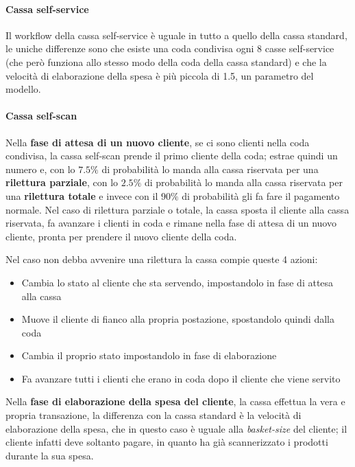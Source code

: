 \paragraph{Cassa self-service}

Il workflow della cassa self-service è uguale in tutto a quello della cassa standard, le uniche differenze sono che esiste una coda condivisa ogni 8 casse self-service (che però funziona allo stesso modo della coda della cassa standard) e che la velocità di elaborazione della spesa è più piccola di 1.5, un parametro del modello.

\paragraph{Cassa self-scan}

Nella \textbf{fase di attesa di un nuovo cliente}, se ci sono clienti nella coda condivisa, la cassa self-scan prende il primo cliente della coda; estrae quindi un numero e, con lo $7.5 \%$ di probabilità lo manda alla cassa riservata per una \textbf{rilettura parziale}, con lo $2.5 \%$ di probabilità lo manda alla cassa riservata per una \textbf{rilettura totale} e invece con il $90 \%$ di probabilità gli fa fare il pagamento normale. Nel caso di rilettura parziale o totale, la cassa sposta il cliente alla cassa riservata, fa avanzare i clienti in coda e rimane nella fase di attesa di un nuovo cliente, pronta per prendere il nuovo cliente della coda.

Nel caso non debba avvenire una rilettura la cassa compie queste 4 azioni:

\begin{itemize}
\item Cambia lo stato al cliente che sta servendo, impostandolo in fase di attesa alla cassa
\item Muove il cliente di fianco alla propria postazione, spostandolo quindi dalla coda
\item Cambia il proprio stato impostandolo in fase di elaborazione
\item Fa avanzare tutti i clienti che erano in coda dopo il cliente che viene servito
\end{itemize}

Nella \textbf{fase di elaborazione della spesa del cliente}, la cassa effettua la vera e propria transazione, la differenza con la cassa standard è la velocità di elaborazione della spesa, che in questo caso è uguale alla \textit{basket-size} del cliente; il cliente infatti deve soltanto pagare, in quanto ha già scannerizzato i prodotti durante la sua spesa.

